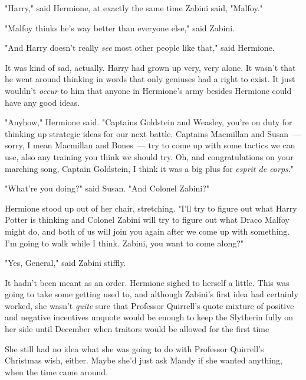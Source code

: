 "Harry," said Hermione, at exactly the same time Zabini said, "Malfoy."

"Malfoy thinks he's way better than everyone else," said Zabini.

"And Harry{\el} doesn't really \emph{see} most other people like that," said
Hermione.

It was kind of sad, actually. Harry had grown up very, very alone. It wasn't
that he went around thinking in words that only geniuses had a right to exist.
It just wouldn't \emph{occur} to him that anyone in Hermione's army besides
Hermione could have any good ideas.

"Anyhow," Hermione said. "Captains Goldstein and Weasley, you're on duty for
thinking up strategic ideas for our next battle. Captains Macmillan and
Susan~--- sorry, I mean Macmillan and Bones~--- try to come up with some tactics we
can use, also any training you think we should try. Oh, and congratulations on
your marching song, Captain Goldstein, I think it was a big plus for
\emph{esprit de corps}."

"What're you doing?" said Susan. "And Colonel Zabini?"

Hermione stood up out of her chair, stretching. "I'll try to figure out what
Harry Potter is thinking and Colonel Zabini will try to figure out what Draco
Malfoy might do, and both of us will join you again after we come up with
something. I'm going to walk while I think. Zabini, you want to come along?"

"Yes, General," said Zabini stiffly.

It hadn't been meant as an order. Hermione sighed to herself a little. This was
going to take some getting used to, and although Zabini's first idea had
certainly worked, she wasn't \emph{quite} sure that Professor Quirrell's quote
mixture of positive and negative incentives unquote would be enough to keep the
Slytherin fully on her side until December when traitors would be allowed for
the first time{\el}

She still had no idea what she was going to do with Professor Quirrell's
Christmas wish, either. Maybe she'd just ask Mandy if she wanted anything, when
the time came around.
